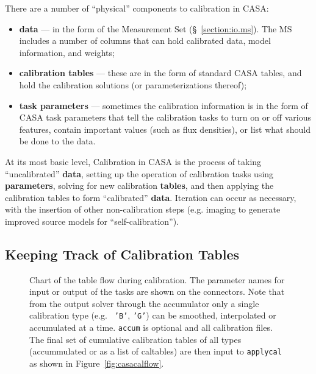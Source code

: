 There are a number of ``physical'' components to calibration in CASA:
\begin{itemize}
   \item {\bf data} --- in the form of the Measurement Set
      (\S~\ref{section:io.ms}).  The MS includes a number of
      columns that can hold calibrated data, model information,
      and weights;
   \item {\bf calibration tables} --- these are in the form of
      standard CASA tables, and hold the calibration solutions
      (or parameterizations thereof);
   \item {\bf task parameters} --- sometimes the calibration
      information is in the form of CASA task parameters that
      tell the calibration tasks to turn on or off various
      features, contain important values (such as flux densities),
      or list what should be done to the data.
\end{itemize}

At its most basic level, Calibration in CASA is the process of taking
``uncalibrated'' {\bf data}, setting up the operation of calibration
tasks using {\bf parameters}, solving for new calibration {\bf
tables}, and then applying the calibration tables to form 
``calibrated'' {\bf data}.  Iteration can occur as necessary, with
the insertion of other non-calibration steps
(e.g. imaging to generate improved source models for
``self-calibration'').

\subsection{Keeping Track of Calibration Tables}
\label{section:cal.flow.tables}

\begin{figure}[h!]
\begin{center}
\caption{\label{fig:casacaltables} Chart of the table flow during
  calibration. The parameter names for input or output of the tasks
  are shown on the connectors.  Note that from the output solver
  through the accumulator only a single calibration type (e.g. {\tt
    'B'}, {\tt 'G'}) can be smoothed, interpolated or accumulated at a
  time.  {\tt accum} is optional and all calibration files. The final
  set of cumulative calibration tables of all types (accummulated or
  as a list of caltables) are then input to {\tt applycal} as shown in
  Figure~\ref{fig:casacalflow}. }
\hrulefill
\end{center}
\end{figure}

